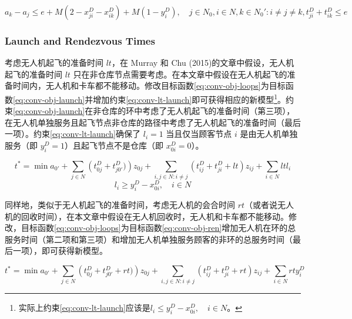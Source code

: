 \documentclass[fontset=none]{ctexart}
\begin{document}
\begin{corollary}
    \begin{equation}
        a_k - a_j \leq e + M\left(2 - x_{ji}^D - x_{ik}^D\right) + M\left(1 - y_i^D\right), \quad j \in N_0, i \in N, k \in N_0': i \neq j \neq k, t_{ji}^D + t_{ik}^D \leq e \tag{7a}\label{eq:conv-time-land}
    \end{equation}
\end{corollary}

\subsubsection{Launch and Rendezvous Times}
考虑无人机起飞的准备时间 $lt$，在 Murray 和 Chu (2015)\cite{murrayFlyingSidekickTraveling2015}的文章中假设，无人机起飞的准备时间 $lt$ 只在非仓库节点需要考虑。在本文章中假设在无人机起飞的准备时间内，无人机和卡车都不能移动。修改目标函数\cref{eq:conv-obj-loops}为目标函数\cref{eq:conv-obj-launch}并增加约束\cref{eq:conv-lt-launch}即可获得相应的新模型\footnote{实际上约束\cref{eq:conv-lt-launch}应该是$l_i \leq y_i^D - x_{0i}^D, \quad i \in N$。}。约束\cref{eq:conv-obj-launch}在非仓库的环中考虑了无人机起飞的准备时间（第三项），在无人机单独服务且起飞节点非仓库的路径中考虑了无人机起飞的准备时间（最后一项）。约束\cref{eq:conv-lt-launch}确保了 $l_i = 1$ 当且仅当顾客节点 $i$ 是由无人机单独服务（即 $y_i^D = 1$）且起飞节点不是仓库（即 $x_{0i}^D = 0$）。 

\begin{corollary}
    \begin{equation}
        t^* = \min a_{0'} + \sum_{j \in N}\left(t_{0j}^D + t_{j0'}^D)\right)z_{0j} + \sum_{i,j \in N: i\neq j}\left(t_{ij}^D + t_{ji}^D + lt\right)z_{ij} + \sum_{i \in N}lt l_i \tag{8}\label{eq:conv-obj-launch}
    \end{equation}
    \begin{equation}
        l_i \geq y_i^D - x_{0i}^D, \quad i \in N \tag{9}\label{eq:conv-lt-launch}
    \end{equation}
\end{corollary}

同样地，类似于无人机起飞的准备时间，考虑无人机的会合时间 $rt$（或者说无人机的回收时间），在本文章中假设在无人机回收时，无人机和卡车都不能移动。修改，目标函数\cref{eq:conv-obj-loops}为目标函数\cref{eq:conv-obj-ren}增加无人机在环的总服务时间（第二项和第三项）和增加无人机单独服务顾客的非环的总服务时间（最后一项），即可获得新模型。

\begin{corollary}
    \begin{equation}
        t^* = \min a_{0'} + \sum_{j \in N}\left(t_{0j}^D + t_{j0'}^D + rt)\right)z_{0j} + \sum_{i,j \in N: i\neq j}\left(t_{ij}^D + t_{ji}^D + rt\right)z_{ij} + \sum_{i \in N}rt y_i^D \tag{9b}\label{eq:conv-obj-ren}
    \end{equation}
\end{corollary}
\end{document}
